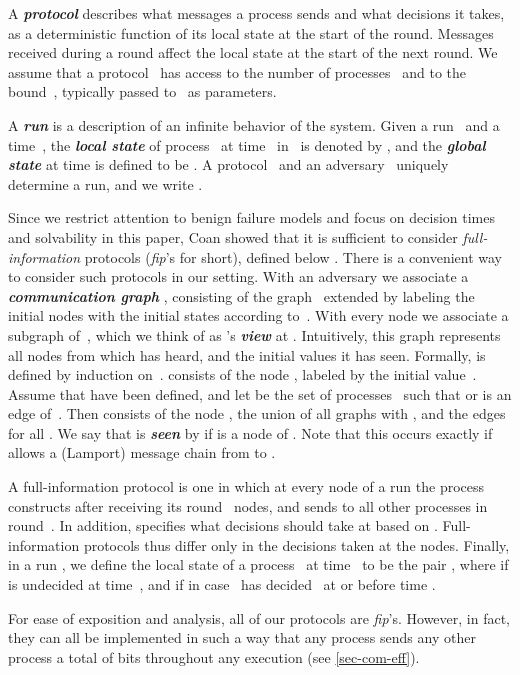 \documentclass[11pt]{article}
\theoremstyle{definition}
\newcommand{\defemph}[1]{\textbf{\textit{#1}}}
\newcommand{\fip}{{\it fip}}
\begin{document}
A \defemph{protocol} describes what messages a process sends and what decisions it takes,
as a deterministic function
 of its local state at the start of the round.  Messages received during a round affect the local state at  the start of the next round.
We assume that a protocol~ has access to the number of processes~ and to the bound~,
typically passed to~ as parameters.

A \defemph{run} is a description of an infinite behavior of the system.
Given a run~ and a time~,
the \defemph{local state} of process~ at time~ in~
is denoted by ,
and the \defemph{global state} at time 
is defined to be .
A protocol~ and an adversary~ uniquely determine a run,
and we write .

Since we restrict attention to benign failure models and focus on decision times and solvability in this paper, Coan showed that it is sufficient to consider {\em full-information} protocols ({\em fip}'s for short), defined below \cite{Coan}.
There is a convenient way to consider such protocols in our setting.
With an adversary  we associate a \defemph{communication graph}
,
consisting of the graph~ extended by labeling the initial nodes  with the initial states  according to~.
With every node  we associate a subgraph   of~, which we think of as 's
\defemph{view} at .
Intuitively, this graph
represents
all nodes  from which  has heard, and the initial values it has seen.
Formally,  is defined by induction on~.
 consists of the node , labeled by the initial value~.
Assume that  have been defined, and let  be the set of processes~ such that  or  is an edge of~. Then
 consists of the node , the union of all graphs  with , and the edges
 for all .
We say that  is
\defemph{seen} by  if  is a node of . Note that this occurs exactly
if  allows a (Lamport) message chain from  to .

A full-information protocol  is one in which at every node  of a run  the process~ constructs  after receiving its round~ nodes, and sends  to all other processes in round~\mbox{}. In addition,  specifies what decisions  should take at  based on .
Full-information protocols thus differ only in the decisions taken at the nodes.
Finally, in a run , we define the local state  of a process~ at time~ to be the pair
, where  if  is undecided at time~, and if  in case~ has decided~
at or before time .

For ease of exposition and analysis, all of our  protocols are
\fip's.
However, in fact, they can all be implemented in such a way that any process sends any other
process a total of  bits throughout any execution
(see \cref{sec-com-eff}).
\end{document}
